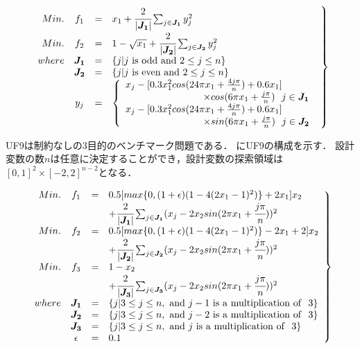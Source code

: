 \documentclass[../main/main]{subfiles}
\begin{document}
\begin{eqnarray} 
\left.
\begin{array}{rccl}
Min. &f_1 &=& x_1 + \cfrac{2}{|\bm{J_1}|} \sum_{j \in \bm{J_1}} y^2_j\\
Min. & f_2 &=& 1 - \sqrt{x_1} + \cfrac{2}{|\bm{J_2}|} \sum_{j \in \bm{J_2}} y^2_j\\

where &  \bm{J_1} &=& \{j|j {\rm \ is \ odd \ and \ } 2 \leq j \leq n\}\\
& \bm{J_2} &=& \{j|j {\rm \ is \ even \ and \ } 2 \leq j \leq n\}\\
& y_j &=& \left\{ 
\begin{array}{l}
x_j - [0.3 x^2_1 cos (24 \pi x_1 + \frac{4j\pi}{n}) + 0.6x_1] \\
\qquad \qquad \qquad \qquad \times cos(6 \pi x_1 + \frac{j \pi}{n}) \ \ j \in \bm{J_1}\\
x_j - [0.3 x^2_1 cos (24 \pi x_1 + \frac{4j\pi}{n}) + 0.6x_1]\\
\qquad \qquad \qquad \qquad \times sin(6 \pi x_1 + \frac{j \pi}{n}) \ \ j \in \bm{J_2}\\
\end{array}
\right.
   \label{uf2_eq} 
\end{array}
\right\}
\end{eqnarray}


UF9は制約なしの3目的のベンチマーク問題である．
にUF9の構成を示す．
設計変数の数$n$は任意に決定することができ，設計変数の探索領域は$[0,1]^2 \times [-2,2]^{n-2}$となる．

\begin{eqnarray} 
\left.
\begin{array}{rccl}
Min. & f_1 &=& 0.5[max\{0, (1 + \epsilon)(1 - 4(2x_1 - 1)^2)\} + 2x_1]x_2 \\
                     &&&                             + \cfrac{2}{|\bm{J_1}|} \sum_{j \in \bm{J_1}}(x_j - 2x_2 sin(2 \pi x_1 + \cfrac{j \pi}{n} ))^2\\
Min. & f_2 &=& 0.5[max\{0, (1 + \epsilon)(1 - 4(2x_1 - 1)^2)\} - 2x_1 + 2]x_2 \\
                      &&&                             + \cfrac{2}{|\bm{J_2}|} \sum_{j \in \bm{J_2}}(x_j - 2x_2 sin(2 \pi x_1 + \cfrac{j \pi}{n} ))^2\\
Min. & f_3 &=& 1-x_2 \\
                                            &&&+ \cfrac{2}{|\bm{J_3}|} \sum_{j \in \bm{J_3}}(x_j - 2x_2 sin(2 \pi x_1 + \cfrac{j \pi}{n} ))^2\\

where &  \bm{J_1} &=& \{j|3 \leq j \leq n, {\rm \ and \ } j - 1 {\rm \ is \ a \ multiplication \ of \ \ } 3\}\\
& \bm{J_2} &=& \{j|3 \leq j \leq n, {\rm \ and \ } j - 2 {\rm \ is \ a \ multiplication \ of \ \ } 3\}\\
& \bm{J_3} &=& \{j|3 \leq j \leq n, {\rm \ and \ } j {\rm \ is \ a \ multiplication \ of \ \ } 3\}\\
&  \epsilon &=& 0.1

   \label{uf9_eq} 
\end{array}
\right\}
\end{eqnarray}
\end{document}

